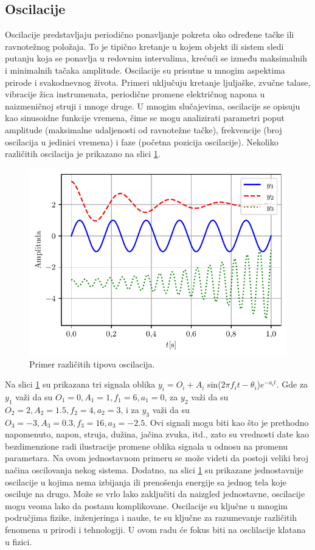 \documentclass[a4paper, 12pt, diplomski]{etf}
\begin{document}
\subsection{Oscilacije}
Oscilacije predstavljaju periodično ponavljanje pokreta oko određene tačke ili ravnotežnog položaja. To je tipično kretanje u kojem objekt ili sistem sledi putanju koja se ponavlja u redovnim intervalima, krećući se između maksimalnih i minimalnih tačaka amplitude. Oscilacije su prisutne u mnogim aspektima prirode i svakodnevnog života. Primeri uključuju kretanje ljuljaške, zvučne talase, vibracije žica instrumenata, periodične promene električnog napona u naizmeničnoj struji i mnoge druge. U mnogim slučajevima, oscilacije se opisuju kao sinusoidne funkcije vremena, čime se mogu analizirati parametri poput amplitude (maksimalne udaljenosti od ravnotežne tačke), frekvencije (broj oscilacija u jedinici vremena) i faze (početna pozicija oscilacije). Nekoliko različitih oscilacija je prikazano na slici \ref{osc_py}.

\begin{figure}[h!]
    \centering
    \includegraphics[scale=1]{py_teorija/osc_py.pdf}
    \caption{Primer različitih tipova oscilacija.}
    \label{osc_py}
\end{figure}

\noindent
Na slici \ref{osc_py} su prikazana tri signala oblika
$y_i = O_i + A_i$ sin($2 \pi f_i t - \theta_i$)$e^{-a_it}$. Gde za $y_1$ važi da su $O_1 = 0, A_1 = 1, f_1 = 6, a_1 = 0$, za $y_2$ važi da su $O_2 = 2, A_2 = 1.5, f_2 = 4, a_2 = 3$, i za $y_3$ važi da su $O_3 = -3, A_3 = 0.3, f_3 = 16, a_3 = -2.5$. Ovi signali mogu biti kao što je prethodno napomenuto, napon, struja, dužina, jačina zvuka, itd., zato su vrednosti date kao bezdimenzione radi ilustracije promene oblika signala u odnosu na promenu parametara. Na ovom jednostavnom primeru se može videti da postoji veliki broj načina oscilovanja nekog sistema. Dodatno, na slici \ref{osc_py} su prikazane jednostavnije oscilacije u kojima nema izbijanja ili prenošenja energije sa jednog tela koje osciluje na drugo. Može se vrlo lako zaključiti da naizgled jednostavne, oscilacije mogu veoma lako da postanu komplikovane. Oscilacije su ključne u mnogim područjima fizike, inženjeringa i nauke, te su ključne za razumevanje različitih fenomena u prirodi i tehnologiji.
U ovom radu će fokus biti na osclilacije klatana u fizici.
\cite{fiz}
\end{document}
